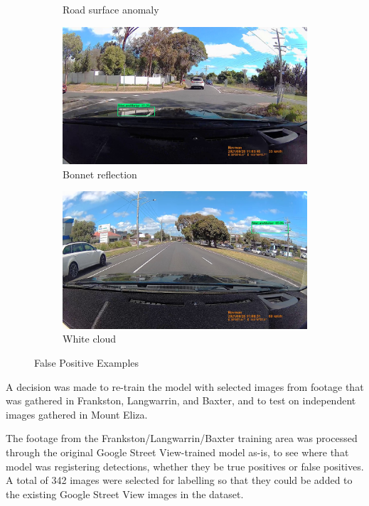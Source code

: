 \documentclass[11pt,twoside]{report}
\begin{document}
\begin{figure}[h]
\begin{subfigure}{0.3\textwidth}
	\caption{Road surface anomaly}
\end{subfigure}
\hfill
\begin{subfigure}{0.3\textwidth}
	\includegraphics[width=\textwidth]{f005_false_positive_reflection.jpg}
	\caption{Bonnet reflection}
\end{subfigure}
\begin{subfigure}{0.3\textwidth}
	\includegraphics[width=\textwidth]{f005_false_positive_random_sky.jpg}
	\caption{White cloud}
\end{subfigure}
\caption{False Positive Examples}
\label{fig:false_positives}
\end{figure}

A decision was made to re-train the model with selected images from footage that was gathered in Frankston, Langwarrin, and Baxter, and to test on independent images gathered in Mount Eliza.  

The footage from the Frankston/Langwarrin/Baxter training area was processed through the original Google Street View-trained model as-is, to see where that model was registering detections, whether they be true positives or false positives.  A total of 342 images were selected for labelling so that they could be added to the existing Google Street View images in the dataset.
\end{document}
